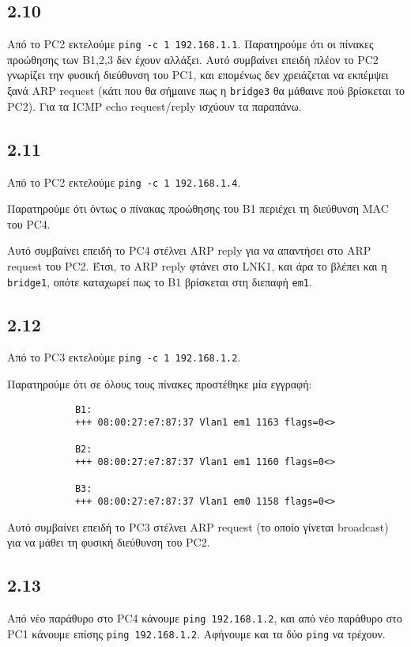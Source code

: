 \documentclass[a4paper, 12pt]{article}
\begin{document}
	\subsection*{2.10}
		Από το PC2 εκτελούμε \verb|ping -c 1 192.168.1.1|. Παρατηρούμε ότι οι πίνακες προώθησης των B1,2,3 δεν έχουν αλλάξει. Αυτό συμβαίνει επειδή πλέον το PC2 γνωρίζει την φυσική διεύθυνση του PC1, και επομένως δεν χρειάζεται να εκπέμψει ξανά ARP request (κάτι που θα σήμαινε πως η \verb|bridge3| θα μάθαινε πού βρίσκεται το PC2). Για τα ICMP echo request/reply ισχύουν τα παραπάνω.

	\subsection*{2.11}
		Από το PC2 εκτελούμε \verb|ping -c 1 192.168.1.4|.
		
		Παρατηρούμε ότι όντως ο πίνακας προώθησης του B1 περιέχει τη διεύθυνση MAC του PC4.
		
		Αυτό συμβαίνει επειδή το PC4 στέλνει ARP reply για να απαντήσει στο ARP request του PC2. Έτσι, το ARP reply φτάνει στο LNK1, και άρα το βλέπει και η \verb|bridge1|, οπότε καταχωρεί πως το B1 βρίσκεται στη διεπαφή \verb|em1|.

	\subsection*{2.12}
		Από το PC3 εκτελούμε \verb|ping -c 1 192.168.1.2|. 
		
		Παρατηρούμε ότι σε όλους τους πίνακες προστέθηκε μία εγγραφή:
		
		\begin{verbatim}
			B1:
			+++ 08:00:27:e7:87:37 Vlan1 em1 1163 flags=0<>
			
			B2:
			+++ 08:00:27:e7:87:37 Vlan1 em1 1160 flags=0<>
			
			B3:	
			+++ 08:00:27:e7:87:37 Vlan1 em0 1158 flags=0<>	
		\end{verbatim}
		
		Αυτό συμβαίνει επειδή το PC3 στέλνει ARP request (το οποίο γίνεται broadcast) για να μάθει τη φυσική διεύθυνση του PC2.

	\subsection*{2.13}
		Από νέο παράθυρο στο PC4 κάνουμε \verb|ping 192.168.1.2|, και από νέο παράθυρο στο PC1 κάνουμε επίσης \verb|ping 192.168.1.2|. Αφήνουμε και τα δύο \verb|ping| να τρέχουν.
\end{document}
